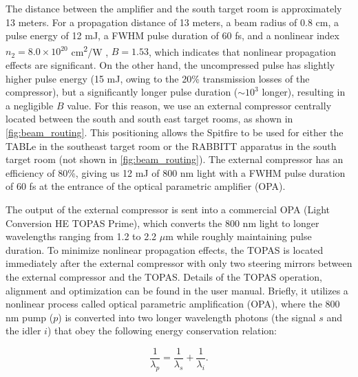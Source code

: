 The distance between the amplifier and the south target room is approximately 13 meters. For a propagation distance of 13 meters, a beam radius of 0.8 cm, a pulse energy of 12 mJ, a FWHM pulse duration of 60 fs, and a nonlinear index $n_2 = 8.0 \times 10^{20}$ cm\textsuperscript{2}/W \cite{zahedpourMeasurementNonlinearRefractive2015}, $B = 1.53$, which indicates that nonlinear propagation effects are significant. On the other hand, the uncompressed pulse has slightly higher pulse energy (15 mJ, owing to the 20\% transmission losses of the compressor), but a significantly longer pulse duration ($\sim 10^3$ longer), resulting in a negligible $B$ value. For this reason, we use an external compressor centrally located between the south and south east target rooms, as shown in \cref{fig:beam_routing}. This positioning allows the Spitfire to be used for either the TABLe in the southeast target room or the RABBITT apparatus \cite{chirlaAttosecondPulseGeneration2011,gormanAttosecondProbingElectron2018,kiesewetterDynamicsNearThresholdAttosecond2019} in the south target room (not shown in \cref{fig:beam_routing}). The external compressor has an efficiency of 80\%, giving us 12 mJ of 800 nm light with a FWHM pulse duration of 60 fs at the entrance of the optical parametric amplifier (OPA).

The output of the external compressor is sent into a commercial OPA (Light Conversion HE TOPAS Prime), which converts the 800 nm light to longer wavelengths ranging from 1.2 to 2.2 $\mu$m while roughly maintaining pulse duration. To minimize nonlinear propagation effects, the TOPAS is located immediately after the external compressor with only two steering mirrors between the external compressor and the TOPAS. Details of the TOPAS operation, alignment and optimization can be found in the user manual. Briefly, it utilizes a nonlinear process called optical parametric amplification (OPA), where the 800 nm pump ($p$) is converted into two longer wavelength photons (the signal $s$ and the idler $i$) that obey the following energy conservation relation:

\begin{equation}
\frac{1}{\lambda_p} = \frac{1}{\lambda_s} + \frac{1}{\lambda_i}.
\end{equation}

